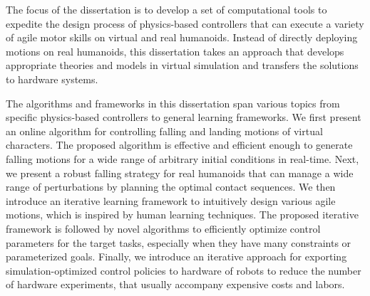 
The focus of the dissertation is to develop a set of computational tools to
expedite the design process of physics-based controllers that can execute a
variety of agile motor skills on virtual and real humanoids.
Instead of directly deploying motions on real humanoids, this dissertation takes
an approach that develops appropriate theories and models in virtual simulation
and  transfers the solutions to hardware systems.

The algorithms and frameworks in this dissertation span various topics from
specific physics-based controllers to general learning frameworks.
We first present an online algorithm for controlling falling and landing
motions of virtual characters.
The proposed algorithm is effective and efficient enough to generate falling
motions for a wide range of arbitrary initial conditions in real-time.
Next, we present a robust falling strategy for real humanoids that can manage
a wide range of perturbations by planning the optimal contact sequences.
We then introduce an iterative learning framework to intuitively design various
agile motions, which is inspired by human learning techniques.
The proposed iterative framework is followed by novel algorithms to
efficiently optimize control parameters for the target tasks, especially when
they have many constraints or parameterized goals.
Finally, we introduce an iterative approach for exporting simulation-optimized
control policies to hardware of robots to reduce the number of hardware
experiments, that usually accompany expensive costs and labors.





